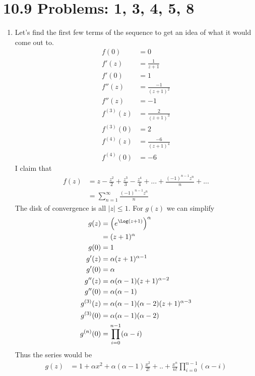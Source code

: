 \documentclass{article}
\begin{document}
  \section{10.9 Problems: 1, 3, 4, 5, 8}
  \begin{enumerate}
    \item
      Let's find the first few terms of the sequence to get an idea of what it would come out to.
      \begin{align*}
        f(0)&=0\\
        f'(z)&=\frac{1}{z+1}\\
        f'(0)&=1\\
        f''(z)&=\frac{-1}{(z+1)^2}\\
        f''(z)&=-1\\
        f^{(3)}(z)&=\frac{2}{(z+1)^3}\\
        f^{(3)}(0)&=2\\
        f^{(4)}(z)&=\frac{-6}{(z+1)^4}\\
        f^{(4)}(0)&=-6
      \end{align*}
      I claim that
      \begin{align*}
        f(z)&=z-\frac{z^2}{2}+\frac{z^3}{3}-\frac{z^4}{4}+...+\frac{(-1)^{n-1}z^n}{n}+...\\
        &=\sum_{n=1}^\infty \frac{(-1)^{n-1}z^n}{n}
      \end{align*}
      The disk of convergence is all $|z|\leq1$. For $g(z)$ we can simplify
      \begin{align*}
        g(z)&=\left(e^{\Log(z+1)}\right)^\alpha\\
        &=(z+1)^\alpha\\
        g(0)&=1\\
        g'(z)&=\alpha(z+1)^{\alpha-1}\\
        g'(0)&=\alpha\\
        g''(z)&=\alpha(\alpha-1)(z+1)^{\alpha-2}\\
        g''(0)&=\alpha(\alpha-1)\\
        g^{(3)}(z)&=\alpha(\alpha-1)(\alpha-2)(z+1)^{\alpha-3}\\
        g^{(3)}(0)&=\alpha(\alpha-1)(\alpha-2)\\
        g^{(n)}(0)&=\prod_{i=0}^{n-1}(\alpha-i)
      \end{align*}
      Thus the series would be
      \begin{align*}
        g(z)&=1+\alpha x^2+\alpha(\alpha-1)\frac{x^2}{2!}+..+\frac{x^n}{n!}\prod_{i=0}^{n-1}(\alpha-i)\\

\end{align*}
\end{enumerate}
\end{document}
